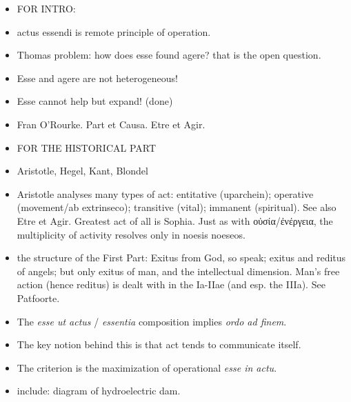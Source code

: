 \begin{DONE}

\begin{NOTES}
\begin{itemize}
  
  \item FOR INTRO:

  \item actus essendi is remote principle of operation.

  \item Thomas problem: how does esse found agere? that is the open question.

  \item Esse and agere are not heterogeneous!

  \item Esse cannot help but expand! (done)

  \item Fran O’Rourke. Part et Causa. Etre et Agir.

  \item FOR THE HISTORICAL PART

  \item Aristotle, Hegel, Kant, Blondel
  
  \item Aristotle analyses many types of act: entitative (uparchein); operative (movement/ab extrinseco); transitive (vital); immanent (spiritual). See also Etre et Agir. Greatest act of all is Sophia. Just as with οὐσία/ἐνέργεια, the multiplicity of activity resolves only in noesis noeseos.

  \item the structure of the First Part: Exitus from God, so speak; exitus and reditus of angels; but only exitus of man, and the intellectual dimension. Man’s free action (hence reditus) is dealt with in the Ia-IIae (and esp. the IIIa). See Patfoorte.



  \item The \emph{esse ut actus} / \emph{essentia} composition implies \emph{ordo ad finem}.
  
  \item The key notion behind this is that act tends to communicate itself.
  
  \item The criterion is the maximization of operational \emph{esse in actu}.
  
  \item include: diagram of hydroelectric dam.



\end{itemize}
\end{NOTES}
\end{DONE}
